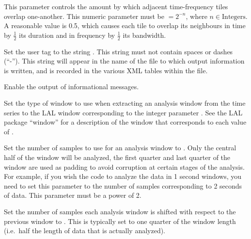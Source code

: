 \begin{entry}
\begin{entry}
\item[\option{--tile-stride-fraction} \parm{fraction}]
This parameter controls the amount by which adjacent time-frequency tiles
overlap one-another.  This numeric parameter must be \(= 2^{-n}\), where
\(n \in \mathrm{Integers}\).  A reasonable value is 0.5, which causes each
tile to overlap its neighbours in time by \(\frac{1}{2}\) its duration and
in frequency by \(\frac{1}{2}\) its bandwidth.

\item[\option{--user-tag} \parm{comment}]
Set the user tag to the string .  This string must not
contain spaces or dashes (``-'').  This string will appear in the name of
the file to which output information is written, and is recorded in the
various XML tables within the file.

\item[\option{--verbose}]
Enable the output of informational messages.

\item[\option{--window} \parm{window}]
Set the type of window to use when extracting an analysis window from the
time series to the LAL window corresponding to the integer parameter
.  See the LAL package ``window'' for a description of the
window that corresponds to each value of .

\item[\option{--window-length} \parm{samples}]
Set the number of samples to use for an analysis window to .
Only the central half of the window will be analyzed, the first quarter and
last quarter of the window are used as padding to avoid corruption at
certain stages of the analysis.  For example, if you wish the code to
analyze the data in 1 second windows, you need to set this parameter to the
number of samples corresponding to 2 seconds of data.  This parameter must
be a power of 2.

\item[\option{--window-shift} \parm{samples}]
Set the number of samples each analysis window is shifted with respect to
the previous window to .  This is typically set to one
quarter of the window length (i.e.\ half the length of data that is
actually analyzed).

\end{entry}



\end{entry}
